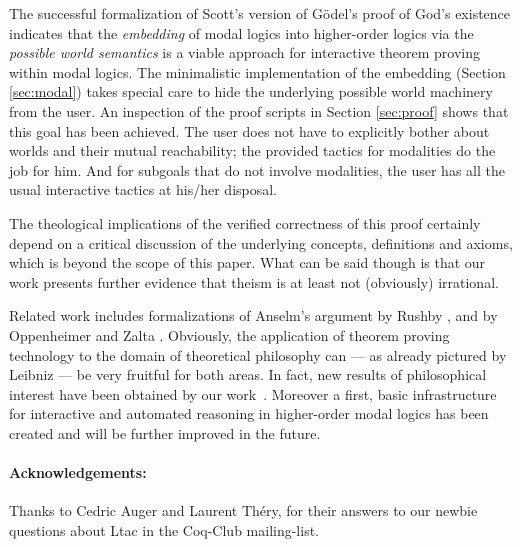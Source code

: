 \documentclass{llncs}
\begin{document}
The successful formalization of Scott's version of G\"odel's proof of
God's existence indicates that the \emph{embedding} of modal logics
into higher-order logics via the \emph{possible world semantics} is a
viable approach for interactive theorem proving within modal logics.
The minimalistic implementation of the embedding (Section
\ref{sec:modal}) takes special care to hide the underlying possible
world machinery from the user.  An inspection of the proof scripts in
Section \ref{sec:proof} shows that this goal has been achieved. The
user does not have to explicitly bother about worlds and their mutual
reachability; the provided tactics for modalities do the job for him.
And for subgoals that do not involve modalities, the user has all the
usual interactive tactics at his/her disposal.

The theological implications of the verified correctness of this proof
certainly depend on a critical discussion of the underlying concepts,
definitions and axioms, which is beyond the scope of this paper. What
can be said though is that our work presents further evidence that
theism is at least not (obviously) irrational. 

Related work includes formalizations of Anselm's argument by Rushby
\cite{Rushby}, and by Oppenheimer and Zalta \cite{Zalta}.  Obviously,
the application of theorem proving technology to the domain of
theoretical philosophy can --- as already pictured by Leibniz ---
be very fruitful for both areas. In fact, new results of
philosophical interest have been obtained by our
work~\cite{arXiv}. Moreover a first, basic infrastructure for
interactive and automated reasoning in higher-order modal logics has
been created and will be further improved in the future.



\paragraph{Acknowledgements:} Thanks to Cedric Auger and Laurent Th\'ery, for their answers to our newbie questions about Ltac in the Coq-Club mailing-list. 
\end{document}
